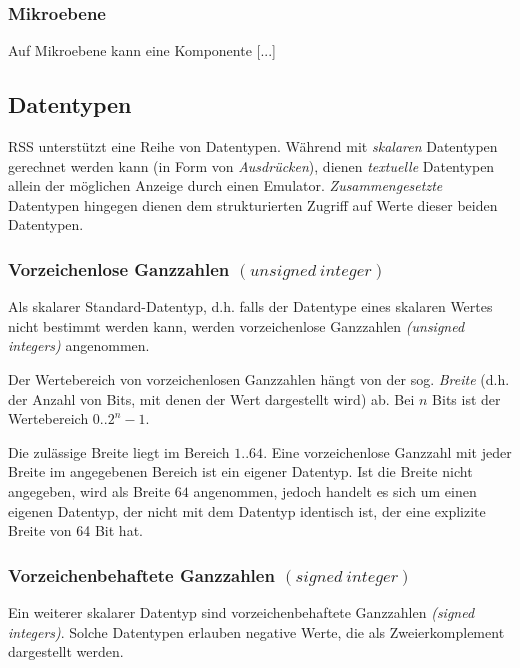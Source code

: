 \documentclass{scrartcl}
\begin{document}
\subsubsection{Mikroebene}

\noindent Auf Mikroebene kann eine Komponente [...]

\subsection{Datentypen}

\noindent RSS unterstützt eine Reihe von Datentypen. Während mit \textit{skalaren} Datentypen gerechnet werden kann (in Form von \textit{Ausdrücken}), dienen \textit{textuelle} Datentypen allein der möglichen Anzeige durch einen Emulator. \textit{Zusammengesetzte} Datentypen hingegen dienen dem strukturierten Zugriff auf Werte dieser beiden Datentypen.

\subsubsection{Vorzeichenlose Ganzzahlen $(unsigned~integer)$}

\noindent Als skalarer Standard-Datentyp, d.h. falls der Datentype eines skalaren Wertes nicht bestimmt werden kann, werden vorzeichenlose Ganzzahlen \textit{(unsigned integers)} angenommen.

\vspace{10pt}
\noindent Der Wertebereich von vorzeichenlosen Ganzzahlen hängt von der sog. \textit{Breite} (d.h. der Anzahl von Bits, mit denen der Wert dargestellt wird) ab. Bei $n$ Bits ist der Wertebereich $0..2^{n} - 1$.

\vspace{10pt}
\noindent Die zulässige Breite liegt im Bereich $1..64$. Eine vorzeichenlose Ganzzahl mit jeder Breite im angegebenen Bereich ist ein eigener Datentyp. Ist die Breite nicht angegeben, wird als Breite $64$ angenommen, jedoch handelt es sich um einen eigenen Datentyp, der nicht mit dem Datentyp identisch ist, der eine explizite Breite von 64 Bit hat.

\subsubsection{Vorzeichenbehaftete Ganzzahlen $(signed~integer)$}

\noindent Ein weiterer skalarer Datentyp sind vorzeichenbehaftete Ganzzahlen \textit{(signed integers)}. Solche Datentypen erlauben negative Werte, die als Zweierkomplement dargestellt werden.
\end{document}
